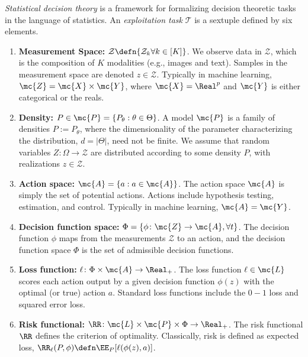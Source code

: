 \documentclass{article}
\begin{document}
\emph{Statistical decision theory} is a framework for formalizing decision theoretic tasks in the language of statistics.  An \emph{exploitation task} $\mathcal{T}$ is a sextuple defined by six elements.
\begin{enumerate}
  \item \textbf{Measurement Space:} $\mathcal{Z} \defn \{ \mathcal{Z}_k \forall k \in [K]\}$. We observe data in $\mathcal{Z}$, which is the composition of  $K$ modalities (e.g., images and text).  Samples in the measurement space are denoted  $z \in \mathcal{Z}$.  Typically in machine learning, $\mc{Z}= \mc{X} \times \mc{Y}$, where $\mc{X} = \Real^p$ and $\mc{Y}$ is either categorical or the reals.
	\item \textbf{Density:} $P \in \mc{P}=\{P_{\theta}: \theta \in \Theta\}$.  A model $\mc{P}$ is a family of densities $P := P_{\theta}$, where the dimensionality of the parameter characterizing the distribution, $d=|\Theta|$, need not be finite.     We assume that random variables $Z \colon \Omega \to \mathcal{Z}$  are distributed according to some density $P$, with realizations $z \in \mathcal{Z}$.
	\item \textbf{Action space:} $\mc{A}=\{a : a \in \mc{A}\}$.  The action space $\mc{A}$ is simply the set of potential actions.  Actions  include hypothesis testing, estimation, and control. Typically in machine learning, $\mc{A}=\mc{Y}$.
	\item \textbf{Decision function space:} $\Phi = \{\phi \colon \mc{Z} \to \mc{A}, \forall t \}$. The decision function $\phi$ maps from the measurements $\mathcal{Z}$ to an action, and the decision function space $\Phi$ is the set of admissible decision functions.
	\item \textbf{Loss function:} $\ell \colon \Phi \times \mc{A}   \to \Real_+$.  The loss function $\ell \in \mc{L}$ scores each action output by a given decision function $\phi(z)$ with the optimal (or true) action $a$.  Standard loss functions include the $0-1$ loss and squared error loss. %
    \item \textbf{Risk functional:} $\RR \colon \mc{L} \times \mc{P} \times \Phi \to \Real_+$.	The risk functional $\RR$ defines the criterion of optimality.  Classically, risk is defined as expected loss, $\RR_\ell(P,\phi) \defn \EE_P[\ell(\phi(z),a)]$. %
\end{enumerate}
\end{document}
